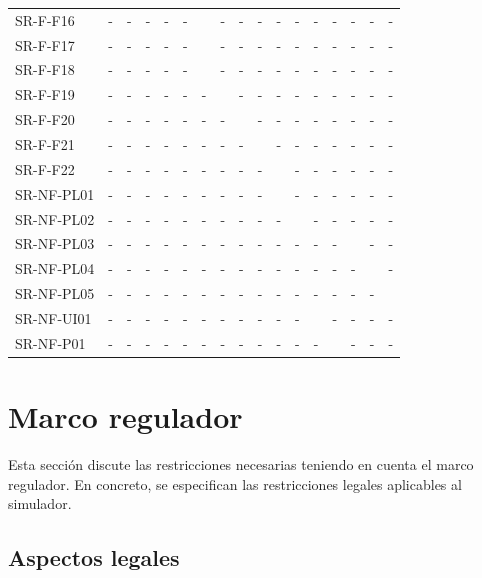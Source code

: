 \begin{table}[htb]
\begin{tabular}{@{}L{3cm}C{0.5cm}C{0.5cm}C{0.5cm}C{0.5cm}C{0.5cm}C{0.5cm}C{0.5cm}C{0.5cm}C{0.5cm}C{0.5cm}C{0.5cm}C{0.5cm}C{0.5cm}C{0.5cm}C{0.5cm}C{0.5cm}@{}}
    SR-F-F16 & - & - & - & - & - &  & - & - & - & - & - & - & - & - & - & - \\
    SR-F-F17 & - & - & - & - & - &  & - & - & - & - & - & - & - & - & - & - \\
    SR-F-F18 & - & - & - & - & - &  & - & - & - & - & - & - & - & - & - & - \\
    SR-F-F19 & - & - & - & - & - & - &  & - & - & - & - & - & - & - & - & - \\
    SR-F-F20 & - & - & - & - & - & - & - &  & - & - & - & - & - & - & - & - \\
    SR-F-F21 & - & - & - & - & - & - & - & - &  & - & - & - & - & - & - & - \\
    SR-F-F22 & - & - & - & - & - & - & - & - & - &  & - & - & - & - & - & - \\
    SR-NF-PL01 & - & - & - & - & - & - & - & - & - &  & - & - & - & - & - & - \\
    SR-NF-PL02 & - & - & - & - & - & - & - & - & - & - &  & - & - & - & - & - \\
    SR-NF-PL03 & - & - & - & - & - & - & - & - & - & - & - & - & - &  & - & - \\
    SR-NF-PL04 & - & - & - & - & - & - & - & - & - & - & - & - & - & - &  & - \\
    SR-NF-PL05 & - & - & - & - & - & - & - & - & - & - & - & - & - & - & - &  \\
    SR-NF-UI01 & - & - & - & - & - & - & - & - & - & - & - &  & - & - & - & - \\
    SR-NF-P01 & - & - & - & - & - & - & - & - & - & - & - & - &  & - & - & - \\
    \bottomrule
\end{tabular}
\label{tab:requirements_matrix}
\end{table}    

\section{Marco regulador}
\label{sec:regulatory_framework}

Esta sección discute las restricciones necesarias teniendo en cuenta el marco regulador. En concreto, se especifican las restricciones legales aplicables al simulador.

\subsection{Aspectos legales}
\label{sec:legal_constraints}

